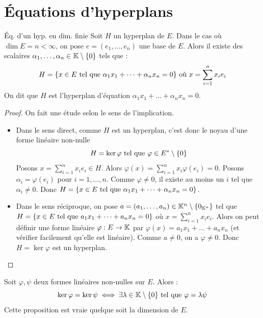 \documentclass[11pt,a4paper]{report}
\begin{document}
\chapter{Équations d'hyperplans}

\begin{customenv}{}{Éq. d'un hyp. en dim. finie}
    Soit $H$ un hyperplan de $E$. Dans le cas où $\dim E = n < \infty$, on pose $e = (e_1,\dots,e_n)$ une base de $E$. Alors il existe des scalaires $\alpha_1,\dots,\alpha_n \in \mathbb{K}\setminus\{0\}$ tels que :
    $$H = \{x \in E \text{ tel que } \alpha_1 x_1 + \dots + \alpha_n x_n = 0\} \text{ où } x = \sum_{i=1}^n x_i e_i$$
    On dit que $H$ est l'hyperplan d'équation $\alpha_1 x_1 + \dots + \alpha_n x_n = 0$.
\end{customenv}

\begin{proof}
    On fait une étude selon le sens de l'implication.
    \begin{itemize}
        \item[$\implies$] Dans le sens direct, comme $H$ est un hyperplan, c'est donc le noyau d'une forme linéaire non-nulle
        $$H = \ker\varphi \text{ tel que } \varphi \in E^* \setminus \{0\}$$
        Posons $x = \sum_{i=1}^n x_i e_i \in H$. Alors $\varphi(x) = \sum_{i=1}^n x_i \varphi(e_i) = 0$. Posons $\alpha_i = \varphi(e_i)$ pour $i=1,\dots,n$. Comme $\varphi \ne 0$, il existe au moins un $i$ tel que $\alpha_i \ne 0$. Donc $H = \{x \in E \text{ tel que } \alpha_1 x_1 + \dots + \alpha_n x_n = 0\}$.
        \item[$\impliedby$] Dans le sens réciproque, on pose $a = (a_1,\dots,a_n) \in \mathbb{K}^n \setminus \{0_{\mathbb{K}^n}\}$ tel que $H = \{x \in E \text{ tel que } a_1 x_1 + \dots + a_n x_n = 0\}$ où $x = \sum_{i=1}^n x_i e_i$. Alors on peut définir une forme linéaire $\varphi : E \to \mathbb{K}$ par $\varphi(x) = a_1 x_1 + \dots + a_n x_n$ (et vérifier facilement qu'elle est linéaire). Comme $a \ne 0$, on a $\varphi \ne 0$. Donc $H = \ker\varphi$ est un hyperplan.
    \end{itemize}
\end{proof}

\begin{proposition}
    Soit $\varphi, \psi$ deux formes linéaires non-nulles sur $E$. Alors :
    $$\ker\varphi = \ker\psi \iff \exists \lambda \in \mathbb{K}\setminus\{0\} \text{ tel que } \varphi = \lambda \psi$$
    Cette proposition est vraie quelque soit la dimension de $E$.
\end{proposition}
\end{document}
